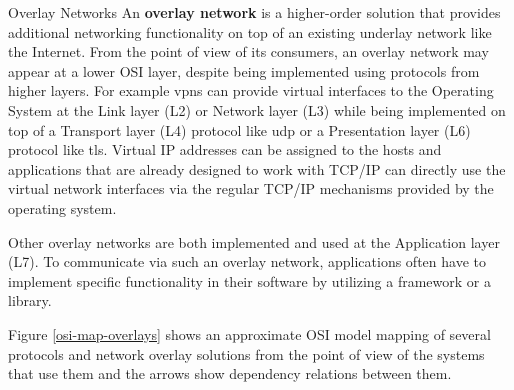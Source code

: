 \label{thesis__022-overlays.md}
\begin{block}{Overlay Networks}
\label{thesis__022-overlays.md__sec:overlays}
An \textbf{overlay network} is a higher-order solution that provides additional networking functionality on top of an existing underlay network like the Internet. From the point of view of its consumers, an overlay network may appear at a lower OSI layer, despite being implemented using protocols from higher layers. For example \glspl{vpn} can provide virtual interfaces to the Operating System at the Link layer (L2) or Network layer (L3) while being implemented on top of a Transport layer (L4) protocol like \gls{udp} or a Presentation layer (L6) protocol like \gls{tls}. Virtual IP addresses can be assigned to the hosts and applications that are already designed to work with TCP/IP can directly use the virtual network interfaces via the regular TCP/IP mechanisms provided by the operating system.

Other overlay networks are both implemented and used at the Application layer (L7). To communicate via such an overlay network, applications often have to implement specific functionality in their software by utilizing a framework or a library.

Figure \ref{osi-map-overlays} shows an approximate OSI model mapping of several protocols and network overlay solutions from the point of view of the systems that use them and the arrows show dependency relations between them.


\end{block}
